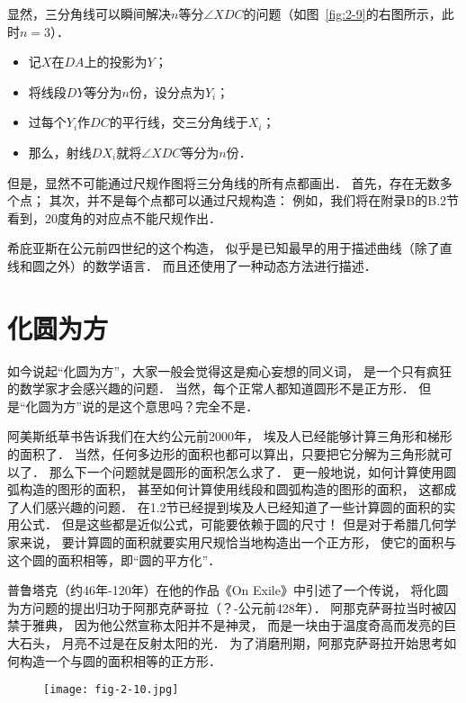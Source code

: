 \documentclass[cn,fancy,blue,11pt]{elegantbook}
\begin{document}
显然，三分角线可以瞬间解决$n$等分$\angle XDC$的问题（如图~\ref{fig:2-9}的右图所示，此时$n=3$）．
\begin{itemize}
	\item 记$X$在$DA$上的投影为$Y$；
	\item 将线段$DY$等分为$n$份，设分点为$Y_i$；
	\item 过每个$Y_i$作$DC$的平行线，交三分角线于$X_i$；
	\item 那么，射线$DX_i$就将$\angle XDC$等分为$n$份．
\end{itemize}

但是，显然不可能通过尺规作图将三分角线的所有点都画出．
首先，存在无数多个点；
其次，并不是每个点都可以通过尺规构造：
例如，我们将在附录B的B.2节看到，20度角的对应点不能尺规作出．

希庇亚斯在公元前四世纪的这个构造，
似乎是已知最早的用于描述曲线（除了直线和圆之外）的数学语言．
而且还使用了一种动态方法进行描述．

\section{化圆为方}

如今说起``化圆为方''，大家一般会觉得这是痴心妄想的同义词，
是一个只有疯狂的数学家才会感兴趣的问题．
当然，每个正常人都知道圆形不是正方形．
但是``化圆为方''说的是这个意思吗？完全不是．

阿美斯纸草书告诉我们在大约公元前2000年，
埃及人已经能够计算三角形和梯形的面积了．
当然，任何多边形的面积也都可以算出，只要把它分解为三角形就可以了．
那么下一个问题就是圆形的面积怎么求了．
更一般地说，如何计算使用圆弧构造的图形的面积，
甚至如何计算使用线段和圆弧构造的图形的面积，
这都成了人们感兴趣的问题．
在1.2节已经提到埃及人已经知道了一些计算圆的面积的实用公式．
但是这些都是近似公式，可能要依赖于圆的尺寸！
但是对于希腊几何学家来说，
要计算圆的面积就要实用尺规恰当地构造出一个正方形，
使它的面积与这个圆的面积相等，即``圆的平方化''．

普鲁塔克（约46年-120年）在他的作品《On Exile》中引述了一个传说，
将化圆为方问题的提出归功于阿那克萨哥拉（？-公元前428年）．
阿那克萨哥拉当时被囚禁于雅典，
因为他公然宣称太阳并不是神灵，
而是一块由于温度奇高而发亮的巨大石头，
月亮不过是在反射太阳的光．
为了消磨刑期，阿那克萨哥拉开始思考如何构造一个与圆的面积相等的正方形．

\begin{figure}[htbp]
	\centering
	\texttt{[image: fig-2-10.jpg]}
	\caption{\label{fig:2-10}}
\end{figure}
\end{document}
